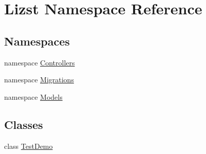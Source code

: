 \hypertarget{namespace_lizst}{}\section{Lizst Namespace Reference}
\label{namespace_lizst}
\subsection*{Namespaces}
\begin{DoxyCompactItemize}
\item 
namespace \mbox{\hyperlink{namespace_lizst_1_1_controllers}{Controllers}}
\item 
namespace \mbox{\hyperlink{namespace_lizst_1_1_migrations}{Migrations}}
\item 
namespace \mbox{\hyperlink{namespace_lizst_1_1_models}{Models}}
\end{DoxyCompactItemize}
\subsection*{Classes}
\begin{DoxyCompactItemize}
\item 
class \mbox{\hyperlink{class_lizst_1_1_test_demo}{Test\+Demo}}
\end{DoxyCompactItemize}
